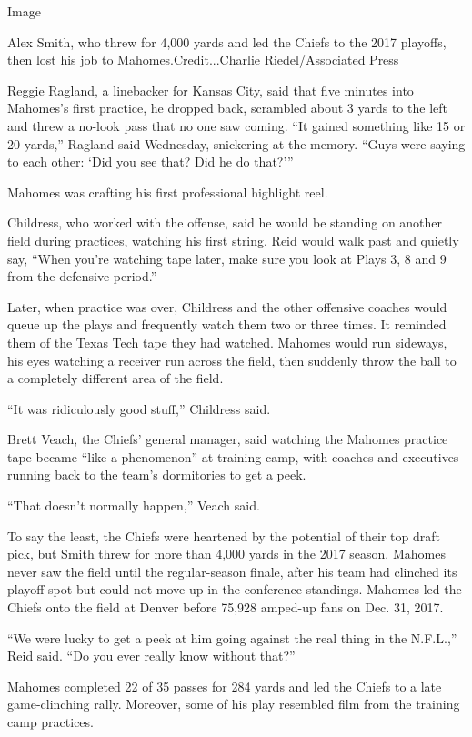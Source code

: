 Image

Alex Smith, who threw for 4,000 yards and led the Chiefs to the 2017
playoffs, then lost his job to Mahomes.Credit...Charlie
Riedel/Associated Press

Reggie Ragland, a linebacker for Kansas City, said that five minutes
into Mahomes's first practice, he dropped back, scrambled about 3 yards
to the left and threw a no-look pass that no one saw coming. ``It gained
something like 15 or 20 yards,'' Ragland said Wednesday, snickering at
the memory. ``Guys were saying to each other: `Did you see that? Did he
do that?'''

Mahomes was crafting his first professional highlight reel.

Childress, who worked with the offense, said he would be standing on
another field during practices, watching his first string. Reid would
walk past and quietly say, ``When you're watching tape later, make sure
you look at Plays 3, 8 and 9 from the defensive period.''

Later, when practice was over, Childress and the other offensive coaches
would queue up the plays and frequently watch them two or three times.
It reminded them of the Texas Tech tape they had watched. Mahomes would
run sideways, his eyes watching a receiver run across the field, then
suddenly throw the ball to a completely different area of the field.

``It was ridiculously good stuff,'' Childress said.

Brett Veach, the Chiefs' general manager, said watching the Mahomes
practice tape became ``like a phenomenon'' at training camp, with
coaches and executives running back to the team's dormitories to get a
peek.

``That doesn't normally happen,'' Veach said.

To say the least, the Chiefs were heartened by the potential of their
top draft pick, but Smith threw for more than 4,000 yards in the 2017
season. Mahomes never saw the field until the regular-season finale,
after his team had clinched its playoff spot but could not move up in
the conference standings. Mahomes led the Chiefs onto the field at
Denver before 75,928 amped-up fans on Dec. 31, 2017.

``We were lucky to get a peek at him going against the real thing in the
N.F.L.,'' Reid said. ``Do you ever really know without that?''

Mahomes completed 22 of 35 passes for 284 yards and led the Chiefs to a
late game-clinching rally. Moreover, some of his play resembled film
from the training camp practices.

